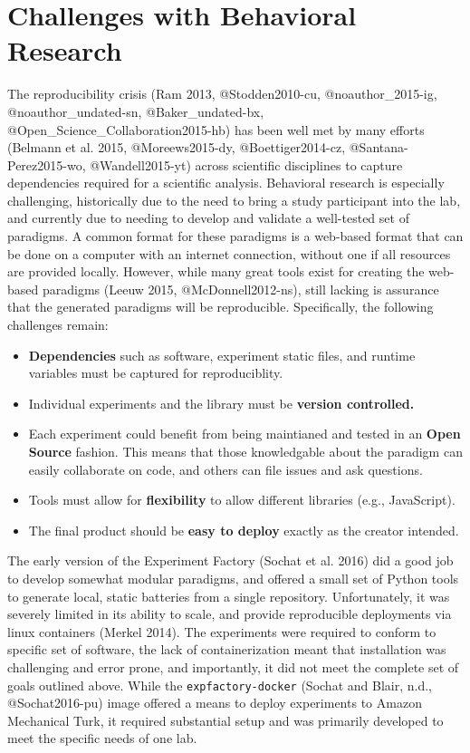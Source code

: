 \documentclass[10pt,a4paper,onecolumn]{article}
\providecommand{\tightlist}{%
  \setlength{\itemsep}{0pt}\setlength{\parskip}{0pt}}
\begin{document}
\hypertarget{challenges-with-behavioral-research}{%
\section{Challenges with Behavioral
Research}\label{challenges-with-behavioral-research}}

The reproducibility crisis (Ram 2013, @Stodden2010-cu,
@noauthor\_2015-ig, @noauthor\_undated-sn, @Baker\_undated-bx,
@Open\_Science\_Collaboration2015-hb) has been well met by many efforts
(Belmann et al. 2015, @Moreews2015-dy, @Boettiger2014-cz,
@Santana-Perez2015-wo, @Wandell2015-yt) across scientific disciplines to
capture dependencies required for a scientific analysis. Behavioral
research is especially challenging, historically due to the need to
bring a study participant into the lab, and currently due to needing to
develop and validate a well-tested set of paradigms. A common format for
these paradigms is a web-based format that can be done on a computer
with an internet connection, without one if all resources are provided
locally. However, while many great tools exist for creating the
web-based paradigms (Leeuw 2015, @McDonnell2012-ns), still lacking is
assurance that the generated paradigms will be reproducible.
Specifically, the following challenges remain:

\begin{itemize}
\tightlist
\item
  \textbf{Dependencies} such as software, experiment static files, and
  runtime variables must be captured for reproduciblity.
\item
  Individual experiments and the library must be \textbf{version
  controlled.}
\item
  Each experiment could benefit from being maintianed and tested in an
  \textbf{Open Source} fashion. This means that those knowledgable about
  the paradigm can easily collaborate on code, and others can file
  issues and ask questions.
\item
  Tools must allow for \textbf{flexibility} to allow different libraries
  (e.g., JavaScript).
\item
  The final product should be \textbf{easy to deploy} exactly as the
  creator intended.
\end{itemize}

The early version of the Experiment Factory (Sochat et al. 2016) did a
good job to develop somewhat modular paradigms, and offered a small set
of Python tools to generate local, static batteries from a single
repository. Unfortunately, it was severely limited in its ability to
scale, and provide reproducible deployments via linux containers (Merkel
2014). The experiments were required to conform to specific set of
software, the lack of containerization meant that installation was
challenging and error prone, and importantly, it did not meet the
complete set of goals outlined above. While the
\texttt{expfactory-docker} (Sochat and Blair, n.d., @Sochat2016-pu)
image offered a means to deploy experiments to Amazon Mechanical Turk,
it required substantial setup and was primarily developed to meet the
specific needs of one lab.
\end{document}
